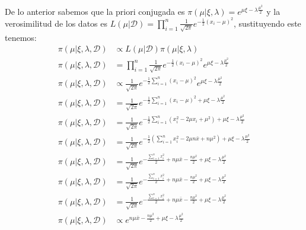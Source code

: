 \documentclass[12pt,]{article}
\begin{document}
De lo anterior sabemos que la priori conjugada es
\(\pi(\mu|\xi,\lambda) = e^{\mu\xi-\lambda\frac{\mu^2}{2}}\) y la
verosimilitud de los datos es
\(L(\mu|\mathcal{D})=\prod_{i=1}^n \frac{1}{\sqrt{2\pi}}e^{-\frac{1}{2}(x_i-\mu)^2}\),
sustituyendo este tenemos: \[
\begin{array}{rl}
\pi(\mu|\xi,\lambda,\mathcal{D}) & \propto L(\mu|\mathcal{D})\pi(\mu|\xi,\lambda)\\
\pi(\mu|\xi,\lambda,\mathcal{D}) & = \prod_{i=1}^n \frac{1}{\sqrt{2\pi}}e^{-\frac{1}{2}(x_i-\mu)^2}e^{\mu\xi-\lambda\frac{\mu^2}{2}}\\
\pi(\mu|\xi,\lambda,\mathcal{D}) & \propto  \frac{1}{\sqrt{2\pi}}e^{-\frac{1}{2} \sum_{i=1}^{n}(x_i-\mu)^2}e^{\mu\xi-\lambda\frac{\mu^2}{2}}\\
\pi(\mu|\xi,\lambda,\mathcal{D}) & = \frac{1}{\sqrt{2\pi}}e^{-\frac{1}{2} \sum_{i=1}^{n}(x_i-\mu)^2+\mu\xi-\lambda\frac{\mu^2}{2}}\\
\pi(\mu|\xi,\lambda,\mathcal{D}) & = \frac{1}{\sqrt{2\pi}}e^{-\frac{1}{2} \sum_{i=1}^{n}(x_i^2-2\mu x_i +\mu^2)+\mu\xi-\lambda\frac{\mu^2}{2}}\\
\pi(\mu|\xi,\lambda,\mathcal{D}) & = \frac{1}{\sqrt{2\pi}}e^{-\frac{1}{2} (\sum_{i=1}^{n}x_i^2-2\mu n \bar{x} +n\mu^2)+\mu\xi-\lambda\frac{\mu^2}{2}}\\
\pi(\mu|\xi,\lambda,\mathcal{D}) & = \frac{1}{\sqrt{2\pi}}e^{-\frac{\sum_{i=1}^{n}x_i^2}{2} +n \mu \bar{x} -\frac{n\mu^2}{2}+\mu\xi-\lambda\frac{\mu^2}{2}}\\
\pi(\mu|\xi,\lambda,\mathcal{D}) & = \frac{1}{\sqrt{2\pi}}e^{-\frac{\sum_{i=1}^{n}x_i^2}{2} +n \mu \bar{x} -\frac{n\mu^2}{2}+\mu\xi-\lambda\frac{\mu^2}{2}}\\
\pi(\mu|\xi,\lambda,\mathcal{D}) & = \frac{1}{\sqrt{2\pi}}e^{-\frac{\sum_{i=1}^{n}x_i^2}{2} +n \mu \bar{x} -\frac{n\mu^2}{2}+\mu\xi-\lambda\frac{\mu^2}{2}}\\
\pi(\mu|\xi,\lambda,\mathcal{D}) & \propto e^{ n \mu \bar{x} -\frac{n\mu^2}{2}+\mu\xi-\lambda\frac{\mu^2}{2}}\\
\end{array}
\]
\end{document}
